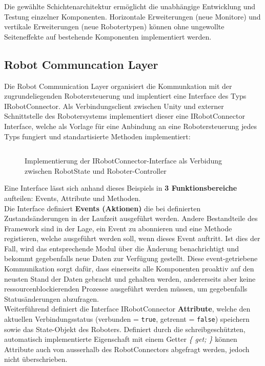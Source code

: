 \noindent
Die gewählte Schichtenarchitektur ermöglicht die unabhängige Entwicklung und
Testung einzelner Komponenten. Horizontale Erweiterungen (neue Monitore) und
vertikale Erweiterungen (neue Robotertypen) können ohne ungewollte Seiteneffekte auf
bestehende Komponenten implementiert werden.


\subsection{Robot Communcation Layer}
Die Robot Communication Layer organisiert die Kommunkation mit der zugrundeliegenden Robotersteuerung und
implentiert eine Interface des Typs IRobotConnector. Als Verbindungsclient
zwischen Unity und externer Schnittstelle des Robotersystems implementiert
dieser eine IRobotConnector Interface, welche als Vorlage für eine Anbindung an
eine Robotersteuerung jedes Typs fungiert und standartisierte Methoden
implementiert:

\begin{figure}[H]
	\inputminted[fontsize=\footnotesize]{csharp}{code-snippets/IRobotConnector.cs}
	\caption{Implementierung der IRobotConnector-Interface als Verbidung zwischen
		RobotState und Roboter-Controller}
\end{figure}
\noindent
Eine Interface lässt sich anhand dieses Beispiels in \textbf{3
	Funktionsbereiche} aufteilen: Events, Attribute und Methoden.\\

\noindent
Die Interface definiert \textbf{Events (Aktionen)} die bei definierten Zustandsänderungen
in der Laufzeit ausgeführt werden. Andere Bestandteile des Framework sind in der
Lage, ein Event zu abonnieren und eine Methode registieren, welche ausgeführt
werden soll, wenn dieses Event auftritt. Ist dies der Fall, wird das
entsprechende Modul über die Änderung benachrichtigt und bekommt gegebenfalls
neue Daten zur Verfügung gestellt. Diese event-getriebene Kommunikation sorgt
dafür, dass einerseits alle Komponenten proaktiv auf den neusten Stand der Daten gebracht
und gehalten werden, andererseits aber keine ressourcenblockierenden Prozesse
ausgeführt werden müssen, um gegebenfalls Statusänderungen abzufragen.\\

\noindent
Weiterführend definiert die Interface IRobotConnector \textbf{Attribute}, welche den
aktuellen Verbindungsstatus (verbunden = \texttt{true}, getrennt = \texttt{false}) speichern sowie das
State-Objekt des Roboters. Definiert durch die schreibgeschützten, automatisch
implementierte Eigenschaft mit einem Getter \textit{\{ get; \}} können Attribute
auch von ausserhalb des RobotConnectors abgefragt werden, jedoch nicht
überschrieben.\\

